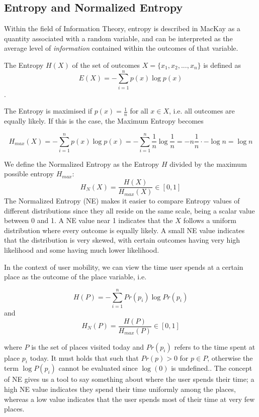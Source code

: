 \subsection{Entropy and Normalized Entropy}
Within the field of Information Theory, entropy is described in MacKay \cite{information-theory} as a quantity associated with a random variable, and can be interpreted as the average level of \textit{information} contained within the outcomes of that variable. 

The Entropy $H(X)$ of the set of outcomes $X = \{x_1, x_2, ..., x_n\}$ is defined as
$$E(X) = -\sum_{i=1}^{n} p(x) \log p(x)$$. 

The Entropy is maximised if $p(x) = \frac{1}{n}$ for all $x \in X$, i.e. all outcomes are equally likely. If this is the case, the Maximum Entropy becomes 


$$H_{max}(X) = - \sum_{i=1}^{n} p(x) \log p(x) = - \sum_{i=1}^{n} \frac{1}{n} \log \frac{1}{n} = -n \frac{1}{n} \cdot -\log n = \log n $$

We define the Normalized Entropy as the Entropy $H$ divided by the maximum possible entropy $H_{max}$:
$$H_N(X) = \frac{H(X)}{H_{max}(X)} \in [0,1]$$
The Normalized Entropy (NE) makes it easier to compare Entropy values of different distributions since they all reside on the same scale, being a scalar value between  0 and 1. A NE value near 1 indicates that the $X$ follows a uniform distribution where every outcome is equally likely. A small NE value indicates that the distribution is very skewed, with certain outcomes having very high likelihood and some having much lower likelihood. 

In the context of user mobility, we can view the time user spends at a certain place as the outcome of the place variable, i.e. 

$$H(P) = - \sum_{i=1}^{n} Pr(p_i) \log Pr(p_i)$$ and
$$H_N(P) = \frac{H(P)}{H_{max}(P)} \in [0,1]$$

where $P$ is the set of places visited today and $Pr(p_i)$ refers to the time spent at place $p_i$ today. It must holds that such that $Pr(p) > 0$ for $p \in P$, otherwise the term $\log P(p_i)$ cannot be evaluated since $\log(0)$ is undefined.. The concept of NE gives us a tool to say something about where the user spends their time; a high NE value indicates they spend their time uniformly among the places, whereas a low value indicates that the user spends most of their time at very few places. 

